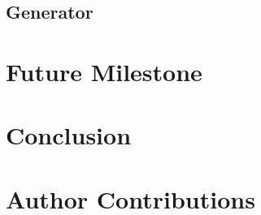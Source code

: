 \documentclass[11pt,letterpaper]{article}
\begin{document}
    \subsection{Generator}
        \label{sub:exp_gen}

\section{Future Milestone}
    \label{sec:future}

\section{Conclusion}
    \label{sec:conclusion}

\section*{Author Contributions}
    \label{sec:contributions}

\nocite{*}

\end{document}
